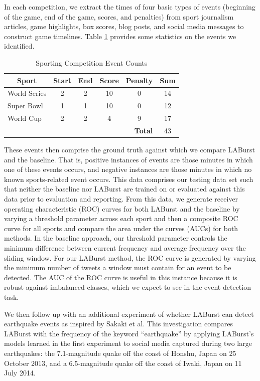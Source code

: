 \documentclass{sig-alternate}
\begin{document}
In each competition, we extract the times of four basic types of events (beginning of the game, end of the game, scores, and penalties) from sport journalism articles, game highlights, box scores, blog posts, and social media messages to construct game timelines.
Table \ref{tab:eventStats} provides some statistics on the events we identified.
%
\begin{table}[htdp]
\caption{Sporting Competition Event Counts}
\begin{center}
\begin{tabular}{|p{0.7in}|c|c|c|c|c|}
\hline
\multicolumn{1}{|c|}{\textbf{Sport}} & \textbf{Start} & \textbf{End} & \textbf{Score} & \textbf{Penalty} & \textbf{Sum} \\ \hline
World Series & 2 & 2 & 10 & 0 & 14 \\ \hline
Super Bowl & 1 & 1 & 10 & 0 & 12 \\ \hline
World Cup & 2 & 2 & 4 & 9 & 17 \\ \hline
\multicolumn{5}{|r|}{\textbf{Total}} & 43 \\ \hline
\end{tabular}
\end{center}
\label{tab:eventStats}
\end{table}

These events then comprise the ground truth against which we compare LABurst and the baseline.
That is, positive instances of events are those minutes in which one of these events occurs, and negative instances are those minutes in which no known sports-related event occurs.
This data comprises our testing data set such that neither the baseline nor LABurst are trained on or evaluated against this data prior to evaluation and reporting.
From this data, we generate receiver operating characteristic (ROC) curves for both LABurst and the baseline by varying a threshold parameter across each sport and then a composite ROC curve for all sports and compare the area under the curves (AUCs) for both methods.
In the baseline approach, our threshold parameter controls the minimum difference between current frequency and average frequency over the sliding window.
For our LABurst method, the ROC curve is generated by varying the minimum number of tweets a window must contain for an event to be detected.
The AUC of the ROC curve is useful in this instance because it is robust against imbalanced classes, which we expect to see in the event detection task.

We then follow up with an additional experiment of whether LABurst can detect earthquake events as inspired by Sakaki et al.
This investigation compares LABurst with the frequency of the keyword ``earthquake'' by applying LABurst's models learned in the first experiment to social media captured during two large earthquakes: the 7.1-magnitude quake off the coast of Honshu, Japan on 25 October 2013, and a 6.5-magnitude quake off the coast of Iwaki, Japan on 11 July 2014.
\end{document}

